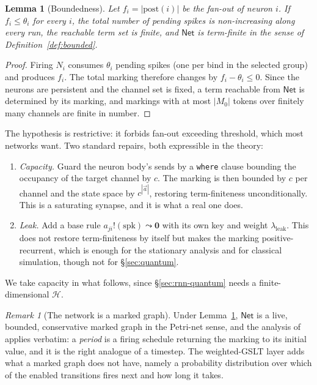 \documentclass[11pt,a4paper]{article}
\theoremstyle{plain}
\newtheorem{lemma}[theorem]{Lemma}
\theoremstyle{definition}
\theoremstyle{remark}
\newtheorem{remark}[theorem]{Remark}
\newcommand{\Nil}{\mathbf{0}}
\begin{document}
\begin{lemma}[Boundedness]
\label{lem:bounded}
Let $f_i = |\mathrm{post}(i)|$ be the fan-out of neuron $i$. If $f_i \leq \theta_i$ for every $i$,
the total number of pending spikes is non-increasing along every run, the reachable term set is
finite, and $\mathsf{Net}$ is term-finite in the sense of Definition~\ref{def:bounded}.
\end{lemma}

\begin{proof}
Firing $N_i$ consumes $\theta_i$ pending spikes (one per bind in the selected group) and produces
$f_i$. The total marking therefore changes by $f_i - \theta_i \leq 0$. Since the neurons are
persistent and the channel set is fixed, a term reachable from $\mathsf{Net}$ is determined by its
marking, and markings with at most $|M_0|$ tokens over finitely many channels are finite in number.
\end{proof}

The hypothesis is restrictive: it forbids fan-out exceeding threshold, which most networks want. Two
standard repairs, both expressible in the theory:

\begin{enumerate}[leftmargin=2.2em]
\item \emph{Capacity.} Guard the neuron body's sends by a \texttt{where} clause bounding the
occupancy of the target channel by $c$. The marking is then bounded by $c$ per channel and the state
space by $c^{|\vec a|}$, restoring term-finiteness unconditionally. This is a saturating synapse, and
it is what a real one does.
\item \emph{Leak.} Add a base rule $a_{ji}!(\mathrm{spk}) \leadsto \Nil$ with its own key and weight
$\lambda_{\text{leak}}$. This does not restore term-finiteness by itself but makes the marking
positive-recurrent, which is enough for the stationary analysis and for classical simulation, though
not for \S\ref{sec:quantum}.
\end{enumerate}

We take capacity in what follows, since \S\ref{sec:rnn-quantum} needs a finite-dimensional
$\mathcal{H}$.

\begin{remark}[The network is a marked graph]
Under Lemma~\ref{lem:bounded}, $\mathsf{Net}$ is a live, bounded, conservative marked graph in the
Petri-net sense, and the analysis of \cite{knots} applies verbatim: a \emph{period} is a firing
schedule returning the marking to its initial value, and it is the right analogue of a timestep. The
weighted-GSLT layer adds what a marked graph does not have, namely a probability distribution over
which of the enabled transitions fires next and how long it takes.
\end{remark}
\end{document}
